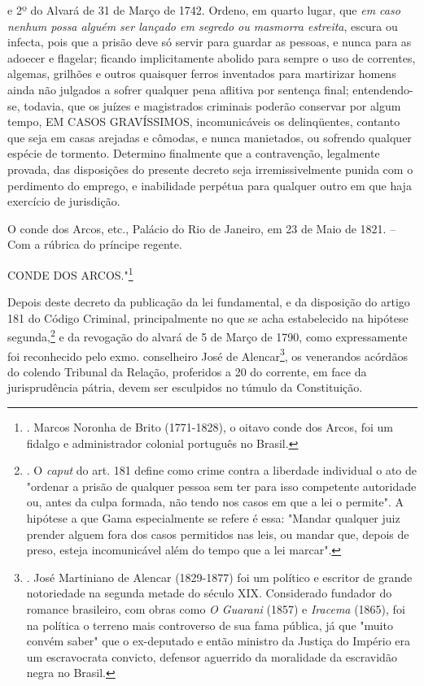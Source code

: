 e 2º do Alvará de 31 de Março de 1742. Ordeno, em quarto lugar, que
\emph{em caso nenhum possa alguém ser lançado em segredo ou masmorra
estreita}, escura ou infecta, pois que a prisão deve só servir para
guardar as pessoas, e nunca para as adoecer e flagelar; ficando
implicitamente abolido para sempre o uso de correntes, algemas, grilhões
e outros quaisquer ferros inventados para martirizar homens ainda não
julgados a sofrer qualquer pena aflitiva por sentença final;
entendendo-se, todavia, que os juízes e magistrados criminais poderão
conservar por algum tempo, EM CASOS GRAVÍSSIMOS, incomunicáveis os
delinqüentes, contanto que seja em casas arejadas e cômodas, e nunca
manietados, ou sofrendo qualquer espécie de tormento. Determino
finalmente que a contravenção, legalmente provada, das disposições do
presente decreto seja irremissivelmente punida com o perdimento do
emprego, e inabilidade perpétua para qualquer outro em que haja
exercício de jurisdição.

O conde dos Arcos, etc., Palácio do Rio de Janeiro, em 23 de Maio de
1821. -- Com a rúbrica do príncipe regente.

CONDE DOS ARCOS."\footnote{. Marcos Noronha de Brito (1771-1828), o
  oitavo conde dos Arcos, foi um fidalgo e administrador colonial
  português no Brasil.}

Depois deste decreto da publicação da lei fundamental, e da disposição
do artigo 181 do Código Criminal, principalmente no que se acha
estabelecido na hipótese segunda,\footnote{. O \emph{caput} do art. 181
  define como crime contra a liberdade individual o ato de "ordenar a
  prisão de qualquer pessoa sem ter para isso competente autoridade ou,
  antes da culpa formada, não tendo nos casos em que a lei o permite". A
  hipótese a que Gama especialmente se refere é essa: "Mandar qualquer
  juiz prender alguem fora dos casos permitidos nas leis, ou mandar que,
  depois de preso, esteja incomunicável além do tempo que a lei marcar".}
e da revogação do alvará de 5 de Março de 1790, como expressamente foi
reconhecido pelo exmo. conselheiro José de Alencar\footnote{. José
  Martiniano de Alencar (1829-1877) foi um político e escritor de grande
  notoriedade na segunda metade do século XIX. Considerado fundador do
  romance brasileiro, com obras como \emph{O Guarani} (1857) e
  \emph{Iracema} (1865), foi na política o terreno mais controverso de
  sua fama pública, já que "muito convém saber" que o ex-deputado e
  então ministro da Justiça do Império era um escravocrata convicto,
  defensor aguerrido da moralidade da escravidão negra no Brasil.},
os venerandos acórdãos do
colendo Tribunal da Relação, proferidos a 20 do corrente, em face da
jurisprudência pátria, devem ser esculpidos no túmulo da Constituição.

